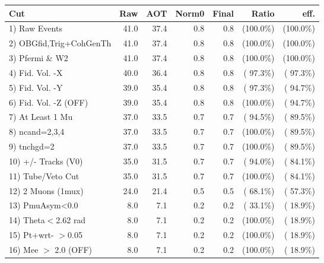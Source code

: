  \begin{table}[h!]\centering
 \begin{tabular}{||l||r|r|r|r|r|r||}
 \hline
 \hline
 Cut & Raw & AOT & Norm0 & Final & Ratio & eff.       \\
 \hline
  1) Raw Events           &         41.0 &         37.4 &          0.8 &          0.8 & (100.0\%) & (100.0\%) \\
  2) OBGfid,Trig+CohGenTh &         41.0 &         37.4 &          0.8 &          0.8 & (100.0\%) & (100.0\%) \\
  3) Pfermi \& W2         &         41.0 &         37.4 &          0.8 &          0.8 & (100.0\%) & (100.0\%) \\
  4) Fid. Vol. -X         &         40.0 &         36.4 &          0.8 &          0.8 & ( 97.3\%) & ( 97.3\%) \\
  5) Fid. Vol. -Y         &         39.0 &         35.4 &          0.8 &          0.8 & ( 97.3\%) & ( 94.7\%) \\
  6) Fid. Vol. -Z (OFF)   &         39.0 &         35.4 &          0.8 &          0.8 & (100.0\%) & ( 94.7\%) \\
  7) At Least 1 Mu        &         37.0 &         33.5 &          0.7 &          0.7 & ( 94.5\%) & ( 89.5\%) \\
  8) ncand=2,3,4          &         37.0 &         33.5 &          0.7 &          0.7 & (100.0\%) & ( 89.5\%) \\
  9) tnchgd=2             &         37.0 &         33.5 &          0.7 &          0.7 & (100.0\%) & ( 89.5\%) \\
 10) +/- Tracks (V0)      &         35.0 &         31.5 &          0.7 &          0.7 & ( 94.0\%) & ( 84.1\%) \\
 11) Tube/Veto Cut        &         35.0 &         31.5 &          0.7 &          0.7 & (100.0\%) & ( 84.1\%) \\
 12) 2 Muons (1mux)       &         24.0 &         21.4 &          0.5 &          0.5 & ( 68.1\%) & ( 57.3\%) \\
 13) PmuAsym<0.0          &          8.0 &          7.1 &          0.2 &          0.2 & ( 33.1\%) & ( 18.9\%) \\
 14) Theta$<$2.62 rad     &          8.0 &          7.1 &          0.2 &          0.2 & (100.0\%) & ( 18.9\%) \\
 15) Pt+wrt- $>$0.05      &          8.0 &          7.1 &          0.2 &          0.2 & (100.0\%) & ( 18.9\%) \\
 16) Mee $>$ 2.0  (OFF)   &          8.0 &          7.1 &          0.2 &          0.2 & (100.0\%) & ( 18.9\%) \\

\end{tabular}
\end{table}

